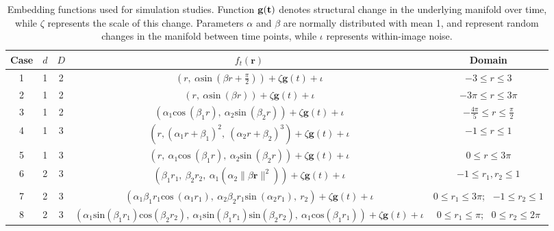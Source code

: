 \documentclass[11pt,reqno]{article}
\theoremstyle{definition}
\begin{document}
\begin{table}[ht]
\small
  \centering
  \begin{tabular}{|c c c c c|}
    \hline
    Case & $d$ & $D$ & $f_t(\mathbf{r})$ & Domain \\
    \hline
    1 & 1 & 2 & $\left(r, \ \alpha \text{sin} \ (\beta r + \frac{\pi}{2})\right) + \zeta\mathbf{g}(t) + \iota$ & $-3 \leq r \leq 3$ \\
    2 & 1 & 2 & $\left(r, \ \alpha\text{sin} \ (\beta r)\right) + \zeta\mathbf{g}(t) + \iota$ & $-3\pi \leq r \leq 3\pi$ \\
    3 & 1 & 2 & $\left(\alpha_1 \text{cos} \ (\beta_1 r), \ \alpha_2\text{sin} \ (\beta_2 r)\right) + \zeta\mathbf{g}(t) + \iota$ & $-\frac{4\pi}{5} \leq r \leq \frac{\pi}{2}$ \\
    4 & 1 & 3 & $\left(r, (\alpha_1r + \beta_1)^2, \ (\alpha_2r + \beta_2)^3\right) + \zeta\mathbf{g}(t) + \iota$ & $-1 \leq r \leq 1$ \\
    5 & 1 & 3 & $\left(r, \ \alpha_1\text{cos} \ (\beta_1 r), \ \alpha_2\text{sin} \ (\beta_2 r) \right) + \zeta\mathbf{g}(t) + \iota$ & $0 \leq r \leq 3\pi$ \\
    6 & 2 & 3 & $\left(\beta_1r_1, \ \beta_2r_2, \ \alpha_1(\alpha_2\|\beta\mathbf{r}\|^2)\right) + \zeta\mathbf{g}(t) + \iota$ & $-1 \leq r_1, r_2 \leq 1$\\
    7 & 2 & 3 & $\left(\alpha_1\beta_1r_1\text{cos} \ (\alpha_1r_1), \ \alpha_2\beta_2r_1\text{sin} \ (\alpha_2r_1), \ r_2\right) + \zeta\mathbf{g}(t) + \iota$ & $0 \leq r_1 \leq 3\pi$; \ $-1 \leq r_2 \leq 1$\\
    8 & 2 & 3 & $\left(\alpha_1\text{sin}(\beta_1r_1)\text{cos}(\beta_2r_2), \ \alpha_1\text{sin}(\beta_1r_1)\text{sin}(\beta_2r_2), \ \alpha_1\text{cos}(\beta_1r_1)\right) + \zeta\mathbf{g}(t) + \iota$ & $0 \leq r_1 \leq \pi$; \ $0 \leq r_2 \leq 2\pi$\\
    \hline
  \end{tabular}
  \caption{Embedding functions used for simulation studies. Function $\bf{g}(t)$ denotes structural change in the underlying manifold over time, while $\zeta$ represents the scale of this change. Parameters $\alpha$ and $\beta$ are normally distributed with mean 1, and represent random changes in the manifold between time points, while $\iota$ represents within-image noise.}
  \label{table:simulation_embeddings}
\end{table}
\end{document}
